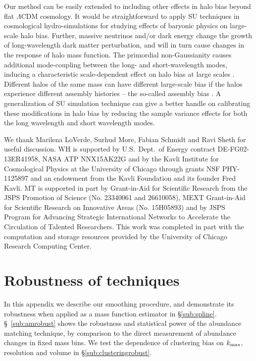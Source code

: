 \documentclass[prd,twocolumn,amsmath,amssymb,floatfix,superscriptaddress]{revtex4-1}
\begin{document}
Our method can be easily extended to including other effects in halo
bias beyond flat $\Lambda$CDM cosmology. It would be straightforward to
apply SU techniques in cosmological hydro-simulations for studying
effects of baryonic physics on large-scale halo bias. Further, massive
neutrinos and/or dark energy change the growth of long-wavelength dark
matter perturbation, and will in turn cause changes in the response of
halo mass function. The primordial non-Gaussianity causes additional
mode-coupling between the long- and short-wavelength modes, inducing a
characteristic scale-dependent effect on halo bias at large scales
\cite{Dalaletal:08}. Different halos of the same mass can have different
large-scale bias if the halos experience different assembly histories --
the so-called assembly bias \cite{Wechsleretal:06,Miyatakeetal:15}. A generalization of 
SU simulation technique can give a better handle on calibrating these
modifications in halo bias by reducing the sample variance effects for both the
long wavelength and short wavelength modes.





\vfill


 We thank Marilena LoVerde,
Surhud More, Fabian Schmidt and Ravi Sheth
for useful discussion.
WH is supported by U.S.~Dept.\ of
Energy contract DE-FG02-13ER41958, NASA ATP NNX15AK22G and by the Kavli
Institute for Cosmological Physics at the University of Chicago through
grants NSF PHY-1125897 and an endowment from the Kavli Foundation and
its founder Fred Kavli.  MT is supported in part by Grant-in-Aid for
Scientific Research from the JSPS Promotion of Science (No. 23340061 and
26610058), MEXT Grant-in-Aid for Scientific Research on Innovative Areas
(No. 15H05893) and by JSPS Program for Advancing Strategic International
Networks to Accelerate the Circulation of Talented Researchers.
This work was completed in part with the computation and storage resources
provided by the University of Chicago Research Computing Center.




\appendix



\section{Robustness of techniques}
\label{sec:robustnesschecks}

In this appendix we describe our smoothing procedure,
and demonstrate its robustness when applied as a mass function estimator in \S \ref{sub:spline}.
\S~\ref{sub:amrobust} shows the robustness and statistical power of the abundance matching
technique, by comparison to the direct measurement of abundance changes in fixed mass bins.
We test the dependence of clustering bias on $k_{\rm max}$, resolution 
and volume in \S \ref{sub:clusteringrobust}.
\end{document}
